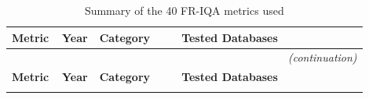 \begin{longtable}{
p{0.13\linewidth}  %
p{0.05\linewidth}  %
p{0.22\linewidth}  %
p{0.50\linewidth}  %
}
    \caption{Summary of the 40 \acs{FR}-\acs{IQA} metrics used}\label{tab:fr_iqa_metrics}\\
    \hline %
    \textbf{Metric} & \textbf{Year} & \textbf{Category} & \textbf{Tested Databases} \\
    \hline %
    \endfirsthead %
    \multicolumn{4}{r}{\small\itshape(continuation)}\\ %
    \hline %
    \textbf{Metric} & \textbf{Year} & \textbf{Category} & \textbf{Tested Databases} \\
    \hline %
    \endhead %
    \hline %
    \endfoot %


\end{longtable}
